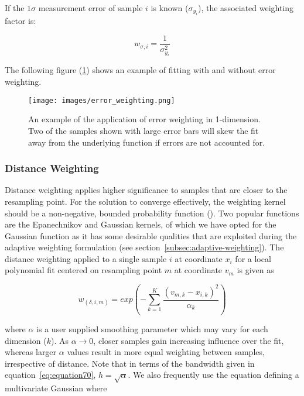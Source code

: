 If the $1\sigma$ measurement error of sample $i$ is known ($\sigma_{y_i}$), the
associated weighting factor is:

\begin{equation}
    w_{\sigma, i} = \frac{1}{\sigma_{y_i}^2}
    \label{eq:equation23}
\end{equation}

The following figure (\ref{fig:error-weighting}) shows an example of fitting
with and without error weighting.

\begin{figure}[H]
  \begin{center}
  \texttt{[image: images/error\_weighting.png]}
  \caption{An example of the application of error weighting in 1-dimension.
           Two of the samples shown with large error bars will skew the
           fit away from the underlying function if errors are not accounted
           for.}
  \label{fig:error-weighting}
  \end{center}
\end{figure}

\subsubsection{Distance Weighting}
\label{subsubsec:distance-weighting}

Distance weighting applies higher significance to samples that are closer to
the resampling point.
For the solution to converge effectively, the weighting kernel should be a
non-negative, bounded probability function (\citet{Gu15}).
Two popular functions are the Epanechnikov and Gaussian kernels, of which we
have opted for the Gaussian function as it has some desirable qualities that
are exploited during the adaptive weighting formulation (see
section~\ref{subsec:adaptive-weighting}).
The distance weighting applied to a single sample $i$ at coordinate $x_i$ for
a local polynomial fit centered on resampling point $m$ at coordinate $v_m$ is
given as

\begin{equation}
        w_{(\delta, i, m)} =
            exp \left(
                   -\sum_{k=1}^{K}{\frac{(v_{m, k} - x_{i, k})^2}{\alpha_k}}
                \right)
        \label{eq:equation25}
\end{equation}

where $\alpha$ is a user supplied smoothing parameter which may vary for each
dimension ($k$).
As $\alpha \rightarrow 0$, closer samples gain increasing influence over the
fit, whereas larger $\alpha$ values result in more equal weighting between
samples, irrespective of distance.
Note that in terms of the bandwidth given in equation~\ref{eq:equation70},
$h = \sqrt{\alpha}$.
We also frequently use the equation defining a multivariate Gaussian where

